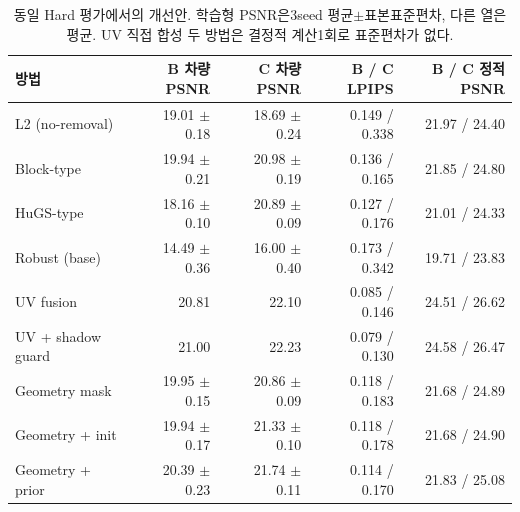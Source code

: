 \begin{table}[htbp]\centering\scriptsize
\caption{동일 Hard 평가에서의 개선안. 학습형 PSNR은3seed 평균$\pm$표본표준편차, 다른 열은 평균. UV 직접 합성 두 방법은 결정적 계산1회로 표준편차가 없다.}
\begin{tabular}{lrrrr}\toprule 방법 & B 차량 PSNR & C 차량 PSNR & B / C LPIPS & B / C 정적 PSNR\\\midrule
L2 (no-removal) & 19.01 $\pm$ 0.18 & 18.69 $\pm$ 0.24 & 0.149 / 0.338 & 21.97 / 24.40 \\
Block-type & 19.94 $\pm$ 0.21 & 20.98 $\pm$ 0.19 & 0.136 / 0.165 & 21.85 / 24.80 \\
HuGS-type & 18.16 $\pm$ 0.10 & 20.89 $\pm$ 0.09 & 0.127 / 0.176 & 21.01 / 24.33 \\
Robust (base) & 14.49 $\pm$ 0.36 & 16.00 $\pm$ 0.40 & 0.173 / 0.342 & 19.71 / 23.83 \\
UV fusion & 20.81 & 22.10 & 0.085 / 0.146 & 24.51 / 26.62 \\
UV + shadow guard & 21.00 & 22.23 & 0.079 / 0.130 & 24.58 / 26.47 \\
Geometry mask & 19.95 $\pm$ 0.15 & 20.86 $\pm$ 0.09 & 0.118 / 0.183 & 21.68 / 24.89 \\
Geometry + init & 19.94 $\pm$ 0.17 & 21.33 $\pm$ 0.10 & 0.118 / 0.178 & 21.68 / 24.90 \\
Geometry + prior & 20.39 $\pm$ 0.23 & 21.74 $\pm$ 0.11 & 0.114 / 0.170 & 21.83 / 25.08 \\\bottomrule\end{tabular}\end{table}
